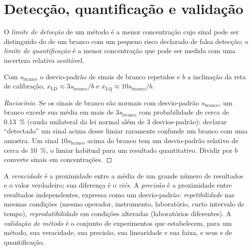 \section{Detecção, quantificação e validação}

\begin{definition}[Limites]\label{def:b2:measurement-statistics:limits}
O \emph{limite de detecção} de um método é a menor concentração cujo
sinal pode ser distinguido do de um branco com um pequeno risco declarado de falsa detecção; o
\emph{limite de quantificação} é a menor concentração que pode
ser medida com uma incerteza relativa aceitável.
\end{definition}

\begin{proposition}\label{prop:b2:measurement-statistics:lod}
Com $s_{\mathrm{branco}}$ o desvio-padrão de sinais de branco repetidos e $b$ a inclinação da
reta de calibração, $x_{\mathrm{LD}} \approx 3s_{\mathrm{branco}}/b$ e $x_{\mathrm{LQ}} \approx
10s_{\mathrm{branco}}/b$.
\end{proposition}

\begin{proof}[Raciocínio]
Se os sinais de branco são normais com desvio-padrão $s_{\mathrm{branco}}$, um branco excede sua média
em mais de $3s_{\mathrm{branco}}$ com probabilidade de cerca de 0.13~\% (cauda unilateral da lei normal
além de 3 desvios-padrão): declarar ``detectado'' um sinal acima desse limiar raramente confunde um
branco com uma amostra. Um sinal $10s_{\mathrm{branco}}$ acima do branco tem um desvio-padrão relativo de
cerca de 10~\%, o limiar habitual para um resultado quantitativo. Dividir por $b$ converte sinais em
concentrações.
\end{proof}

\begin{definition}[Validação]\label{def:b2:measurement-statistics:validation}
A \emph{veracidade} é a proximidade entre a média de um grande número de resultados e o valor
verdadeiro; sua diferença é o \emph{viés}. A \emph{precisão} é a
proximidade entre resultados independentes, expressa como um desvio-padrão:
\emph{repetibilidade} nas mesmas condições (mesmo operador, instrumento,
laboratório, curto intervalo de tempo), \emph{reprodutibilidade} em condições
alteradas (laboratórios diferentes). A \emph{validação de método} é o conjunto
de experimentos que estabelecem, para um método, sua veracidade, sua precisão, sua linearidade e sua
faixa, e seus  e de quantificação.
\end{definition}

